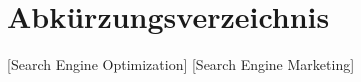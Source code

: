 %
\chapter{Abkürzungsverzeichnis}
\label{sec:Einleitung}

\begin{acronym}[laaaaaaaaaaaaaaaaang]
	[Search Engine Optimization]
	[Search Engine Marketing]
\end{acronym}
